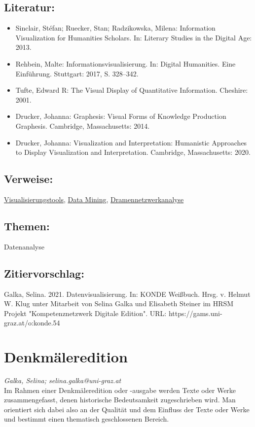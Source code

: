 \documentclass{article}
\begin{document}
        \subsection*{Literatur:}\begin{itemize}\item Sinclair, Stéfan; Ruecker, Stan; Radzikowska, Milena: Information Visualization for Humanities Scholars. In: Literary Studies in the Digital Age: 2013.\item Rehbein, Malte: Informationsvisualisierung. In: Digital Humanities. Eine Einführung. Stuttgart: 2017, S. 328–342.\item Tufte, Edward R: The Visual Display of Quantitative Information. Cheshire: 2001.\item Drucker, Johanna: Graphesis: Visual Forms of Knowledge Production Graphesis. Cambridge, Massachusetts: 2014.\item Drucker, Johanna: Visualization and Interpretation: Humanistic Approaches to Display Visualization and Interpretation. Cambridge, Massachusetts: 2020.\end{itemize}\subsection*{Verweise:}\href{https://gams.uni-graz.at/o:konde.210}{Visualisierungstools}, \href{https://gams.uni-graz.at/o:konde.48}{Data Mining}, \href{https://gams.uni-graz.at/o:konde.74}{Dramennetzwerkanalyse}\subsection*{Themen:}Datenanalyse\subsection*{Zitiervorschlag:}Galka, Selina. 2021. Datenvisualisierung. In: KONDE Weißbuch. Hrsg. v. Helmut W. Klug unter Mitarbeit von Selina Galka und Elisabeth Steiner im HRSM Projekt "Kompetenznetzwerk Digitale Edition". URL: https://gams.uni-graz.at/o:konde.54\newpage\section*{Denkmäleredition} \emph{Galka, Selina; selina.galka@uni-graz.at }\\
        
    Im Rahmen einer Denkmäleredition oder -ausgabe werden Texte oder Werke
                  zusammengefasst, denen historische Bedeutsamkeit zugeschrieben wird. Man
                  orientiert sich dabei also an der Qualität und dem Einfluss der Texte oder Werke
                  und bestimmt einen thematisch geschlossenen Bereich. \\
            
\end{document}
